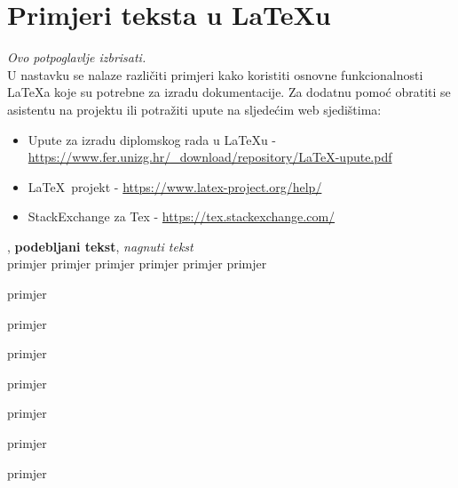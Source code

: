 		
		
		\section{Primjeri teksta u \LaTeX u}
		
		\textit{Ovo potpoglavlje izbrisati.}\\

		U nastavku se nalaze različiti primjeri kako koristiti osnovne funkcionalnosti \LaTeX a koje su potrebne za izradu dokumentacije. Za dodatnu pomoć obratiti se asistentu na projektu ili potražiti upute na sljedećim web sjedištima:
		\begin{itemize}
			\item Upute za izradu diplomskog rada u \LaTeX u - \url{https://www.fer.unizg.hr/_download/repository/LaTeX-upute.pdf}
			\item \LaTeX\ projekt - \url{https://www.latex-project.org/help/}
			\item StackExchange za Tex - \url{https://tex.stackexchange.com/}\\
		
		\end{itemize} 	


		
		\noindent {}, \textbf{podebljani tekst}, 	\textit{nagnuti tekst}\\
		\noindent \normalsize primjer \large primjer \Large primjer \LARGE {primjer} \huge {primjer} \Huge primjer \normalsize
				
		\begin{packed_item}
			
			\item  primjer
			\item  primjer
			\item  primjer
			\item[] \begin{packed_enum}
				\item primjer
				\item[] \begin{packed_enum}
					\item[1.a] primjer
					\item[b] primjer
				\end{packed_enum}
				\item primjer
			\end{packed_enum}
			
		\end{packed_item}
		
